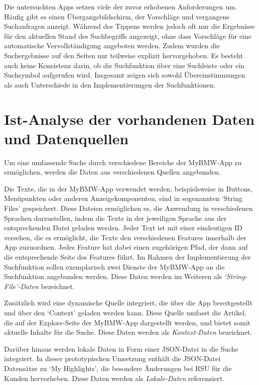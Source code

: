 \documentclass[
  12pt,
  a4paperpaper,
]{report}
\begin{document}
Die untersuchten Apps setzen viele der zuvor erhobenen Anforderungen um.
Häufig gibt es einen Übergangsbildschirm, der Vorschläge und vergangene
Suchanfragen anzeigt. Während des Tippens werden jedoch oft nur die
Ergebnisse für den aktuellen Stand des Suchbegriffs angezeigt, ohne dass
Vorschläge für eine automatische Vervollständigung angeboten werden.
Zudem wurden die Suchergebnisse auf den Seiten nur teilweise explizit
hervorgehoben. Es besteht auch keine Konsistenz darin, ob die
Suchfunktion über eine Suchleiste oder ein Suchsymbol aufgerufen wird.
Insgesamt zeigen sich sowohl Übereinstimmungen als auch Unterschiede in
den Implementierungen der Suchfunktionen.

\section{Ist-Analyse der vorhandenen Daten und
Datenquellen}\label{ist-analyse-der-vorhandenen-daten-und-datenquellen}

Um eine umfassende Suche durch verschiedene Bereiche der MyBMW-App zu
ermöglichen, werden die Daten aus verschiedenen Quellen angebunden.

Die Texte, die in der MyBMW-App verwendet werden, beispielsweise in
Buttons, Menüpunkten oder anderen Anzeigekomponenten, sind in
sogenannten `String Files' gespeichert. Diese Dateien ermöglichen es,
die Anwendung in verschiedenen Sprachen darzustellen, indem die Texte in
der jeweiligen Sprache aus der entsprechenden Datei geladen werden.
Jeder Text ist mit einer eindeutigen ID versehen, die es ermöglicht, die
Texte den verschiedenen Features innerhalb der App zuzuordnen. Jedes
Feature hat dabei einen zugehörigen Pfad, der dann auf die entsprechende
Seite des Features führt. Im Rahmen der Implementierung der Suchfunktion
sollen exemplarisch zwei Dienste der MyBMW-App an die Suchfunktion
angebunden werden. Diese Daten werden im Weiteren als
\emph{`String-File'-Daten} bezeichnet.

Zusätzlich wird eine dynamische Quelle integriert, die über die App
bereitgestellt und über den `Context' geladen werden kann. Diese Quelle
umfasst die Artikel, die auf der Explore-Seite der MyBMW-App dargestellt
werden, und bietet somit aktuelle Inhalte für die Suche. Diese Daten
werden als \emph{Kontext-Daten} bezeichnet.

Darüber hinaus werden lokale Daten in Form einer JSON-Datei in die Suche
integriert. In dieser prototypischen Umsetzung enthält die JSON-Datei
Datensätze zu `My Highlights', die besondere Änderungen bei RSU für die
Kunden hervorheben. Diese Daten werden als \emph{Lokale-Daten}
referenziert.
\end{document}
